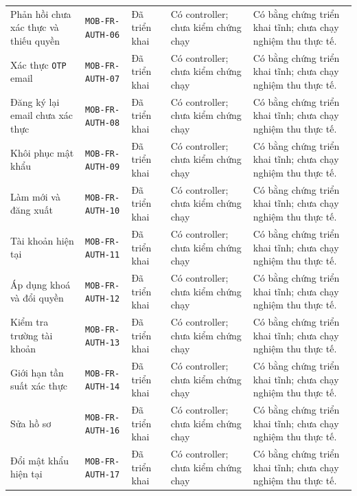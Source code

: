 \begin{longtable}{@{}P{0.19000\SRSWidth}P{0.18000\SRSWidth}P{0.15000\SRSWidth}P{0.20000\SRSWidth}P{0.28000\SRSWidth}@{}}
Phản hồi chưa xác thực và thiếu quyền & \texttt{MOB-\allowbreak{}FR-\allowbreak{}AUTH-\allowbreak{}06} & Đã triển khai & Có controller; chưa kiểm chứng chạy & Có bằng chứng triển khai tĩnh; chưa chạy nghiệm thu thực tế. \\[3pt]
Xác thực \texttt{OTP} email & \texttt{MOB-\allowbreak{}FR-\allowbreak{}AUTH-\allowbreak{}07} & Đã triển khai & Có controller; chưa kiểm chứng chạy & Có bằng chứng triển khai tĩnh; chưa chạy nghiệm thu thực tế. \\[3pt]
Đăng ký lại email chưa xác thực & \texttt{MOB-\allowbreak{}FR-\allowbreak{}AUTH-\allowbreak{}08} & Đã triển khai & Có controller; chưa kiểm chứng chạy & Có bằng chứng triển khai tĩnh; chưa chạy nghiệm thu thực tế. \\[3pt]
Khôi phục mật khẩu & \texttt{MOB-\allowbreak{}FR-\allowbreak{}AUTH-\allowbreak{}09} & Đã triển khai & Có controller; chưa kiểm chứng chạy & Có bằng chứng triển khai tĩnh; chưa chạy nghiệm thu thực tế. \\[3pt]
Làm mới và đăng xuất & \texttt{MOB-\allowbreak{}FR-\allowbreak{}AUTH-\allowbreak{}10} & Đã triển khai & Có controller; chưa kiểm chứng chạy & Có bằng chứng triển khai tĩnh; chưa chạy nghiệm thu thực tế. \\[3pt]
Tài khoản hiện tại & \texttt{MOB-\allowbreak{}FR-\allowbreak{}AUTH-\allowbreak{}11} & Đã triển khai & Có controller; chưa kiểm chứng chạy & Có bằng chứng triển khai tĩnh; chưa chạy nghiệm thu thực tế. \\[3pt]
Áp dụng khoá và đổi quyền & \texttt{MOB-\allowbreak{}FR-\allowbreak{}AUTH-\allowbreak{}12} & Đã triển khai & Có controller; chưa kiểm chứng chạy & Có bằng chứng triển khai tĩnh; chưa chạy nghiệm thu thực tế. \\[3pt]
Kiểm tra trường tài khoản & \texttt{MOB-\allowbreak{}FR-\allowbreak{}AUTH-\allowbreak{}13} & Đã triển khai & Có controller; chưa kiểm chứng chạy & Có bằng chứng triển khai tĩnh; chưa chạy nghiệm thu thực tế. \\[3pt]
Giới hạn tần suất xác thực & \texttt{MOB-\allowbreak{}FR-\allowbreak{}AUTH-\allowbreak{}14} & Đã triển khai & Có controller; chưa kiểm chứng chạy & Có bằng chứng triển khai tĩnh; chưa chạy nghiệm thu thực tế. \\[3pt]
Sửa hồ sơ & \texttt{MOB-\allowbreak{}FR-\allowbreak{}AUTH-\allowbreak{}16} & Đã triển khai & Có controller; chưa kiểm chứng chạy & Có bằng chứng triển khai tĩnh; chưa chạy nghiệm thu thực tế. \\[3pt]
Đổi mật khẩu hiện tại & \texttt{MOB-\allowbreak{}FR-\allowbreak{}AUTH-\allowbreak{}17} & Đã triển khai & Có controller; chưa kiểm chứng chạy & Có bằng chứng triển khai tĩnh; chưa chạy nghiệm thu thực tế. \\[3pt]

\end{longtable}
